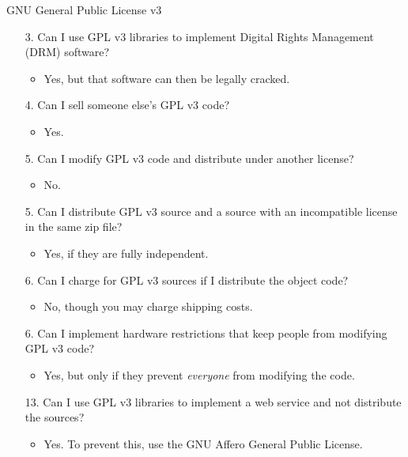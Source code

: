 \documentclass{beamer}
\begin{document}
\begin{frame}{GNU General Public License v3 \hfill\href{http://www.gnu.org/copyleft/gpl.html}{}}
\begin{itemize}
\item[3.] Can I use GPL v3 libraries to implement Digital Rights Management (DRM) software? \\
\begin{itemize}
\item<2->Yes, but that software can then be legally cracked.
\end{itemize}
\item[4.] Can I sell someone else's GPL v3 code?
\begin{itemize}
\item<2->Yes.
\end{itemize}
\item[5.] Can I modify GPL v3 code and distribute under another license?
\begin{itemize}
\item<2-> No.
\end{itemize}
\item[5.] Can I distribute GPL v3 source and a source with an incompatible license in the same zip file?
\begin{itemize}
\item<2->Yes, if they are fully independent.
\end{itemize}
\item[6.] Can I charge for GPL v3 sources if I distribute the object code?
\begin{itemize}
\item<2-> No, though you may charge shipping costs.
\end{itemize}
\item[6.] Can I implement hardware restrictions that keep people from modifying GPL v3 code?
\begin{itemize}
\item<2-> Yes, but only if they prevent \emph{everyone} from modifying the code.
\end{itemize}
\item[13.] Can I use GPL v3 libraries to implement a web service and not distribute the sources?
\begin{itemize}
\item<2-> Yes. To prevent this, use the GNU Affero General Public License.
\end{itemize}
\end{itemize}
\end{frame}
\end{document}
